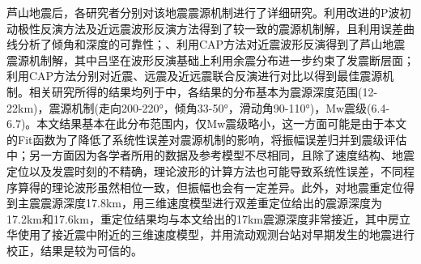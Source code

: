 芦山地震后，各研究者分别对该地震震源机制进行了详细研究。利用\citet{Hardebeck2002}改进的P波初动极性反演方法及近远震波形反演方法得到了较一致的震源机制解，且利用误差曲线分析了倾角和深度的可靠性；、利用CAP方法对近震波形反演得到了芦山地震震源机制解，其中吕坚在波形反演基础上利用余震分布进一步约束了发震断层面；利用CAP方法分别对近震、远震及近远震联合反演进行对比以得到最佳震源机制。相关研究所得的结果均列于中，各结果的分布基本为震源深度范围(12-22km)，震源机制(走向200-220°，倾角33-50°，滑动角90-110°)，Mw震级(6.4-6.7)。本文结果基本在此分布范围内，仅Mw震级略小，这一方面可能是由于本文的Fit函数为了降低了系统性误差对震源机制的影响，将振幅误差归并到震级评估中；另一方面因为各学者所用的数据及参考模型不尽相同，且除了速度结构、地震定位以及发震时刻的不精确，理论波形的计算方法也可能导致系统性误差，不同程序算得的理论波形虽然相位一致，但振幅也会有一定差异\citep{Herrmann1985}。此外，对地震重定位得到主震震源深度17.8km，用三维速度模型进行双差重定位给出的震源深度为17.2km和17.6km，重定位结果均与本文给出的17km震源深度非常接近，其中房立华使用了接近震中附近的三维速度模型，并用流动观测台站对早期发生的地震进行校正，结果是较为可信的。
